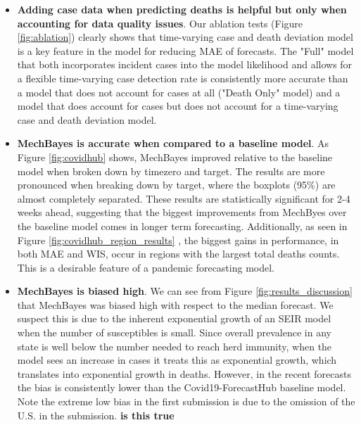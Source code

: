 \documentclass[11pt]{amsart}
\begin{document}
\begin{itemize}
\item \textbf{Adding case data when predicting deaths is helpful but only when accounting for data quality issues}. Our ablation tests (Figure \ref{fig:ablation}) clearly shows that time-varying case and death deviation model is a key feature in the model for reducing MAE of forecasts. The "Full" model that both incorporates incident cases into the model likelihood and allows for a flexible time-varying case detection rate is consistently more accurate than a model that does not account for cases at all ("Death Only" model) and a model that does account for cases but does not account for a time-varying case and death deviation model.


\item \textbf{MechBayes is accurate when compared to a baseline model}. As Figure \ref{fig:covidhub} shows, MechBayes improved relative to the baseline model when broken down by timezero and target. The results are more pronounced when breaking down by target, where the boxplots (95\%) are almost completely separated. These results are statistically significant for 2-4 weeks ahead, suggesting that the biggest improvements from MechByes over the baseline model comes in longer term forecasting.  Additionally, as seen in Figure \ref{fig:covidhub_region_results} , the biggest gains in performance, in both MAE and WIS, occur in regions with the largest total deaths counts. This is a desirable feature of a pandemic forecasting model. 


\item \textbf{MechBayes is biased high}. We can see from Figure \ref{fig:results_discussion} that MechBayes was biased high with respect to the median forecast. We suspect this is due to the inherent exponential growth of an SEIR model when the number of susceptibles is small. Since overall prevalence in any state is well below the number needed to reach herd immunity, when the model sees an increase in cases it treats this as exponential growth, which translates into exponential growth in deaths. However, in the recent forecasts the bias is consistently lower than the Covid19-ForecastHub baseline model. Note the extreme low bias in the first submission is due to the omission of the U.S. in the submission. \textbf{is this true} 


\end{itemize}
\end{document}
